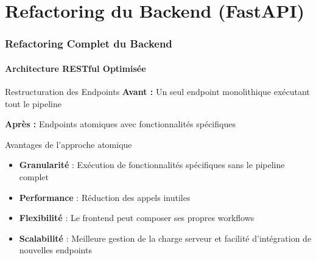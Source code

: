 \documentclass[
	11pt,
	aspectratio=169,
]{beamer}
\begin{document}

\section{Refactoring du Backend (FastAPI)}

\begin{frame}
	\frametitle{Refactoring Complet du Backend}
	\framesubtitle{Architecture RESTful Optimisée}
	
	\begin{block}{Restructuration des Endpoints}
		\textbf{Avant :} Un seul endpoint monolithique exécutant tout le pipeline
		
		\bigskip
		
		\textbf{Après :} Endpoints atomiques avec fonctionnalités spécifiques
	\end{block}
	
	\smallskip
	
	\begin{exampleblock}{Avantages de l'approche atomique}
		\begin{itemize}
			\item \textbf{Granularité} : Exécution de fonctionnalités spécifiques
			sans le pipeline complet
			\item \textbf{Performance} : Réduction des appels inutiles
			\item \textbf{Flexibilité} : Le frontend peut composer ses propres
			workflows
			\item \textbf{Scalabilité} : Meilleure gestion de la charge serveur
			et facilité d'intégration de nouvelles endpoints
		\end{itemize}
	\end{exampleblock}
\end{frame}

\end{document}
